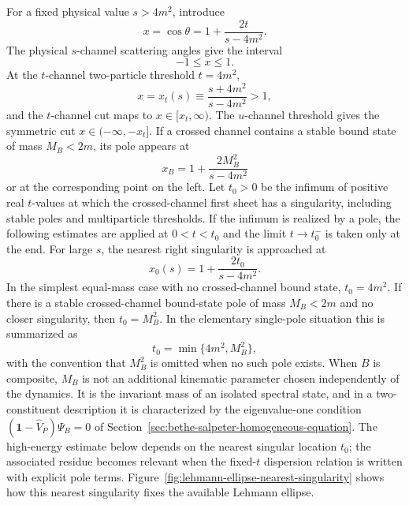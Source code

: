For a fixed physical value \(s>4m^2\), introduce
\[
  x=\cos\theta
  =
  1+\frac{2t}{s-4m^2}.
\]
The physical \(s\)-channel scattering angles give the interval
\[
  -1\le x\le1 .
\]
At the \(t\)-channel two-particle threshold \(t=4m^2\),
\[
  x=x_t(s)\equiv\frac{s+4m^2}{s-4m^2}>1,
\]
and the \(t\)-channel cut maps to \(x\in[x_t,\infty)\).  The \(u\)-channel
threshold gives the symmetric cut \(x\in(-\infty,-x_t]\).  If a crossed
channel contains a stable bound state of mass \(M_B<2m\), its pole appears
at
\[
  x_B=1+\frac{2M_B^2}{s-4m^2}
\]
or at the corresponding point on the left.  Let \(t_0>0\) be the infimum of
positive real \(t\)-values at which the crossed-channel first sheet has a
singularity, including stable poles and multiparticle thresholds.  If the
infimum is realized by a pole, the following estimates are applied at
\(0<t<t_0\) and the limit \(t\to t_0^-\) is taken only at the end.  For
large \(s\), the nearest right singularity is approached at
\[
  x_0(s)=1+\frac{2t_0}{s-4m^2}.
\]
In the simplest equal-mass case with no crossed-channel bound state,
\(t_0=4m^2\).  If there is a stable crossed-channel bound-state pole of mass
\(M_B<2m\) and no closer singularity, then \(t_0=M_B^2\).  In the elementary
single-pole situation this is summarized as
\[
  t_0=\min\{4m^2,M_B^2\},
\]
with the convention that \(M_B^2\) is omitted when no such pole exists.
When \(B\) is composite, \(M_B\) is not an additional kinematic parameter
chosen independently of the dynamics.  It is the invariant mass of an isolated
spectral state, and in a two-constituent description it is characterized by the
eigenvalue-one condition
\((\mathbf 1-\widehat V_P)\Psi_B=0\) of
Section~\ref{sec:bethe-salpeter-homogeneous-equation}.  The high-energy
estimate below depends on the nearest singular location \(t_0\); the associated
residue becomes relevant when the fixed-\(t\) dispersion relation is written
with explicit pole terms.  Figure~\ref{fig:lehmann-ellipse-nearest-singularity}
shows how this nearest singularity fixes the available Lehmann ellipse.

